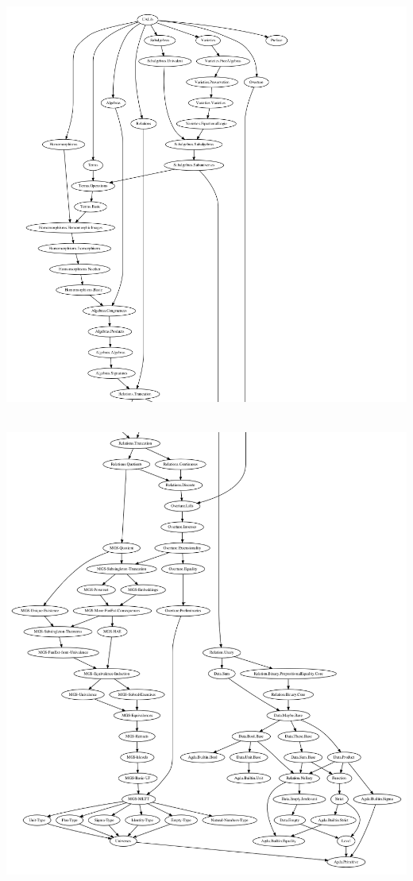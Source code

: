 \documentclass[a4paper,UKenglish,cleveref,autoref,thm-restate,12pt]{../lipics-v2021-wjd}
\begin{document}
~\hskip-1.5cm\includegraphics[scale=0.65]{ualib-graph-top.png}

\newpage

~\hskip-2.5cm\includegraphics[scale=0.55]{ualib-graph-bot.png}
% 
\end{document}
